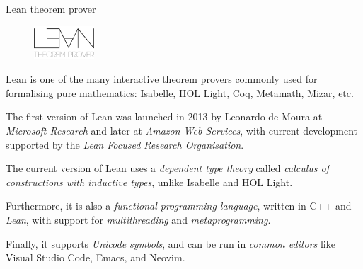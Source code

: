 \documentclass[10pt]{beamer}
\begin{document}
\begin{frame}[t]{Lean theorem prover}

\begin{figure}
\vspace{-0.5cm} \includegraphics[width=0.2\textwidth]{lean.png}
\end{figure}

Lean is one of the many interactive theorem provers commonly used for formalising pure mathematics: Isabelle, HOL Light, Coq, Metamath, Mizar, etc.

\pause

\vspace{0.5cm} The first version of Lean was launched in 2013 by Leonardo de Moura at \emph{Microsoft Research} and later at \emph{Amazon Web Services}, with current development supported by the \emph{Lean Focused Research Organisation}.

\pause

\vspace{0.5cm} The current version of Lean uses a \emph{dependent type theory} called \emph{calculus of constructions with inductive types}, unlike Isabelle and HOL Light.

\pause

\vspace{0.5cm} Furthermore, it is also a \emph{functional programming language}, written in C++ and \emph{Lean}, with support for \emph{multithreading} and \emph{metaprogramming}.

\pause

\vspace{0.5cm} Finally, it supports \emph{Unicode symbols}, and can be run in \emph{common editors} like Visual Studio Code, Emacs, and Neovim.

\end{frame}
\end{document}
